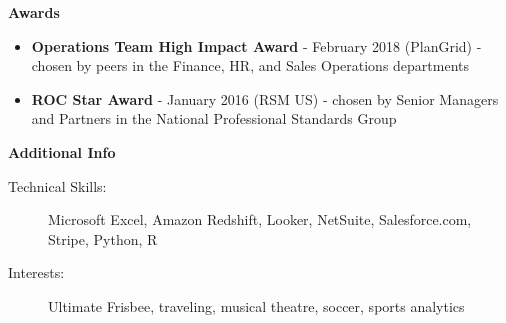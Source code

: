 \documentclass[10pt]{article}
\begin{document}
  {\large \textbf{Awards}}
  \begin{itemize}
    \item  \textbf{Operations Team High Impact Award} - February 2018 (PlanGrid) - chosen by peers in the Finance, HR, and Sales Operations departments
    \item \textbf{ROC Star Award} - January 2016 (RSM US) - chosen by Senior Managers and Partners in the National Professional Standards Group
  \end{itemize}

  {\large \textbf{Additional Info}}

  \begin{description}

    \item[Technical Skills:]
Microsoft Excel, Amazon Redshift, Looker, NetSuite, Salesforce.com, Stripe, Python, R

    \item[Interests:]
Ultimate Frisbee, traveling, musical theatre, soccer, sports analytics

  \end{description}
\end{document}
